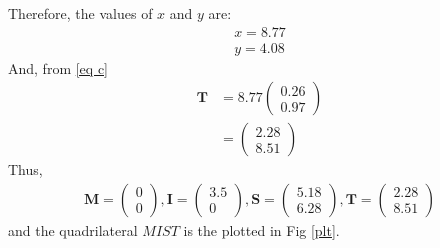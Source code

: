 \documentclass{beamer}
\newcommand{\myvec}[1]{\ensuremath{\begin{pmatrix}#1\end{pmatrix}}}
\renewcommand{\vec}[1]{\mathbf{#1}}
\begin{document}
\begin{frame}
Therefore, the values of $x$ and $y$ are:
\begin{align}
	x = 8.77 \\
	y = 4.08
\end{align}
And, from \eqref{eq c}
\begin{align}
\vec{T} &= 8.77 \myvec{ 0.26 \\ 0.97 }\\
		&= \myvec{ 2.28 \\ 8.51	}
\end{align}
Thus,
\begin{align}
\vec{M}=\myvec{0\\0}, \vec{I}=\myvec{3.5\\0}, \vec{S}=\myvec{5.18\\6.28}, \vec{T}=\myvec{2.28 \\ 8.51}
\end{align}
and the quadrilateral $MIST$ is the plotted in Fig \ref{plt}.
\end{frame}
\end{document}
